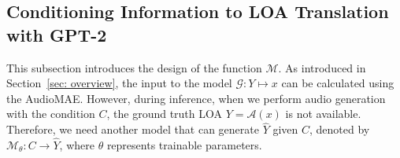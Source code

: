 \documentclass[lettersize,journal]{IEEEtran}
\begin{document}
\subsection{Conditioning Information to LOA Translation with GPT-2}
\label{sec: audio semantic language modeling}

\noindent
This subsection introduces the design of the function $\mathcal{M}$. As introduced in Section~\ref{sec: overview}, the input to the model $\mathcal{G}: Y \mapsto x$ can be calculated using the AudioMAE. However, during inference, when we perform audio generation with the condition $C$, the ground truth LOA $Y=\mathcal{A}(x)$ is not available. Therefore, we need another model that can generate $\hat{Y}$ given $C$, denoted by $\mathcal{M}_{\theta}: C\rightarrow \hat{Y}$, where $\theta$ represents trainable parameters. 
\end{document}
